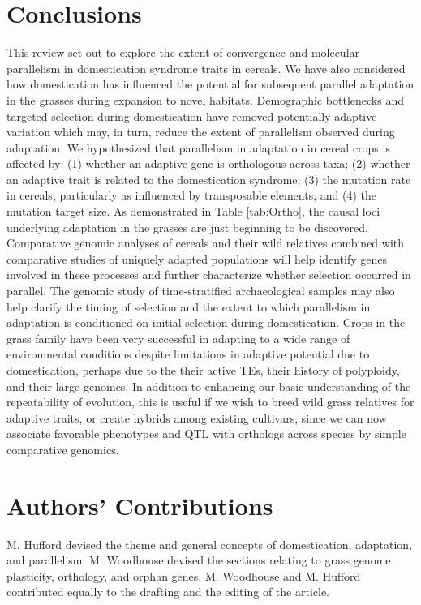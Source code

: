 \documentclass[12pt]{article}
\begin{document}
\section*{Conclusions}

This review set out to explore the extent of convergence and molecular parallelism in domestication syndrome traits in cereals.
We have also considered how domestication has influenced the potential for subsequent parallel adaptation in the grasses during expansion to novel habitats. 
Demographic bottlenecks and targeted selection during domestication have removed potentially adaptive variation which may, in turn, reduce the extent of parallelism observed during adaptation.
We hypothesized that parallelism in adaptation in cereal crops is affected by:  (1) whether an adaptive gene is orthologous across taxa; (2) whether an adaptive trait is related to the domestication syndrome; (3) the mutation rate in cereals, particularly as influenced by transposable elements; and (4) the mutation target size.
As demonstrated in Table \ref{tab:Ortho}, the causal loci underlying adaptation in the grasses are just beginning to be discovered.
Comparative genomic analyses of cereals and their wild relatives combined with comparative studies of uniquely adapted populations will help identify genes involved in these processes and further characterize whether selection occurred in parallel.
The genomic study of time-stratified archaeological samples may also help clarify the timing of selection and the extent to which parallelism in adaptation is conditioned on initial selection during domestication.
Crops in the grass family have been very successful in adapting to a wide range of environmental conditions despite limitations in adaptive potential due to domestication, perhaps due to the their active TEs, their history of polyploidy, and their large genomes.
In addition to enhancing our basic understanding of the repeatability of evolution, this is useful if we wish to breed wild grass relatives for adaptive traits, or create hybrids among existing cultivars, since we can now associate favorable phenotypes and QTL with orthologs across species by simple comparative genomics.

\section*{Authors' Contributions}
M. Hufford devised the theme and general concepts of domestication, adaptation, and parallelism. M. Woodhouse devised the sections relating to grass genome plasticity, orthology, and orphan genes. M. Woodhouse and M. Hufford contributed equally to the drafting and the editing of the article.
\end{document}
